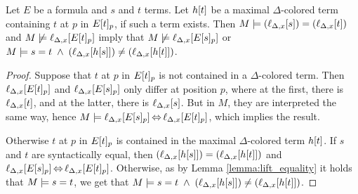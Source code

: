 \documentclass[,%
	paper=a4,%
	DIV14, 
	liststotoc,
	bibtotoc,
	draft=false,%
	numbers=noendperiod
]{scrartcl}
\newcommand{\lif}[1]{\lift{\Delta}{#1}{x}}
\begin{document}
			\begin{lemma}
					\label{aga5tg5ba}
				Let $E$ be a formula and $s$ and $t$ terms.
					Let $h[t]$ be a maximal $\Delta$-colored term containing $t$ at $p$ in $E{[t]_{p}}$, if such a term exists.
					Then
					$M \entails (\lif{s}) = (\lif{t})$ and $M\notentails \lif{E\occurat{t}{p}}$ imply that $M\notentails \lif{E\occurat{s}{p}}$
					or $M\entails s=t \;\land\;(\lif{h\occur{s}}) \neq (\lif{h\occur{t}})$.
				\end{lemma}
				\begin{proof} 
					Suppose that $t$ at $p$ in $E{[t]_{p}}$ is not contained in a $\Delta$-colored term.
					Then $\lif{E\occurat{t}{p}}$ and $\lif{E\occurat{s}{p}}$ only differ at position $p$, where at the first, there is $\lif{t}$, and at the latter, there is $\lif{s}$. But in $M$, they are interpreted the same way, hence $M\entails \lif{E\occurat{s}{p}} \semiff \lif{E\occurat{t}{p}}$, which implies the result.

					Otherwise $t$ at $p$ in $E{[t]_{p}}$ is contained in the maximal $\Delta$-colored term $h[t]$.
					If $s$ and $t$ are syntactically equal, then $(\lif{h\occur{s}}) = (\lif{h\occur{t}})$ and $\lif{E\occurat{s}{p}} \semiff{} \lif{E\occurat{t}{p}}$.
					Otherwise, as by Lemma \ref{lemma:lift_equality} it holds that $M\models s=t$,
					we get that $M \entails\nolinebreak s=\nolinebreak t \;\land\;(\lif{h\occur{s}})  \neq (\lif{h\occur{t}})$.
				\end{proof} 
\end{document}

